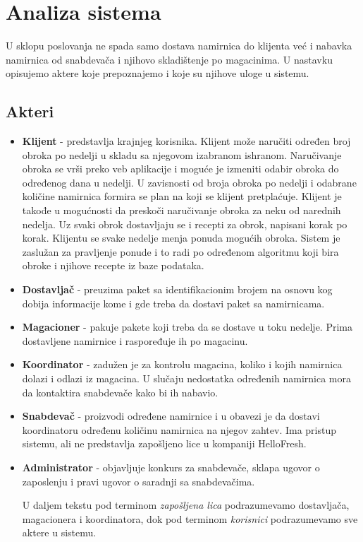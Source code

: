 
\section{Analiza sistema}

	U sklopu poslovanja ne spada samo dostava namirnica do klijenta već i nabavka namirnica od snabdevača i njihovo skladištenje po magacinima. U nastavku opisujemo aktere koje prepoznajemo i koje su njihove uloge u sistemu.

\subsection{Akteri}
	\begin{itemize}
		\item{\textbf{Klijent}} - predstavlja krajnjeg korisnika. Klijent može naručiti određen broj obroka po nedelji u skladu sa njegovom izabranom ishranom. Naručivanje obroka se vrši preko veb aplikacije i moguće je izmeniti odabir obroka do određenog dana u nedelji. U zavisnosti od broja obroka po nedelji i odabrane količine namirnica formira se plan na koji se klijent pretplaćuje. Klijent je takođe u mogućnosti da preskoči naručivanje obroka za neku od narednih nedelja. Uz svaki obrok dostavljaju se i recepti za obrok, napisani korak po korak. Klijentu se svake nedelje menja ponuda mogućih obroka. Sistem je zaslužan za pravljenje ponude i to radi po određenom algoritmu koji bira obroke i njihove recepte iz baze podataka.
		\item{\textbf{Dostavljač}} - preuzima paket sa identifikacionim brojem na osnovu kog dobija informacije kome i gde treba da dostavi paket sa namirnicama.
		\item{\textbf{Magacioner}} - pakuje pakete koji treba da se dostave u toku nedelje. Prima dostavljene namirnice i raspoređuje ih po magacinu.
		\item{\textbf{Koordinator}} - zadužen je za kontrolu magacina, koliko i kojih namirnica dolazi i odlazi iz magacina. U slučaju nedostatka određenih namirnica mora da kontaktira snabdevače kako bi ih nabavio.
		\item{\textbf{Snabdevač}} - proizvodi određene namirnice i u obavezi je da dostavi koordinatoru određenu količinu namirnica na njegov zahtev. Ima pristup sistemu, ali ne predstavlja zapošljeno lice u kompaniji HelloFresh.
		\item{\textbf{Administrator}} - objavljuje konkurs za snabdevače, sklapa ugovor o zaposlenju i pravi ugovor o saradnji sa snabdevačima.
		
		U daljem tekstu pod terminom \textit{zapošljena lica} podrazumevamo dostavljača, magacionera i koordinatora, dok pod terminom \textit{korisnici} podrazumevamo sve aktere u sistemu.
		
				
	\end{itemize}
